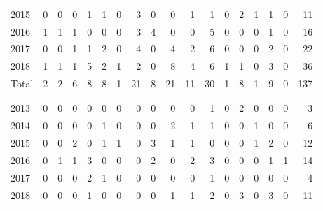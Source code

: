 \documentclass[a4paper]{article}
\begin{document}
\begin{table}
{\begin{tabular}[t]{lrrrrrrrrrrrrrrrrr}
\hspace{1em}\hspace{1em}2015 & 0 & 0 & 0 & 1 & 1 & 0 & 3 & 0 & 0 & 1 & 1 & 0 & 2 & 1 & 1 & 0 & 11\\
\hspace{1em}\hspace{1em}2016 & 1 & 1 & 1 & 0 & 0 & 0 & 3 & 4 & 0 & 0 & 5 & 0 & 0 & 0 & 1 & 0 & 16\\
\hspace{1em}\hspace{1em}2017 & 0 & 0 & 1 & 1 & 2 & 0 & 4 & 0 & 4 & 2 & 6 & 0 & 0 & 0 & 2 & 0 & 22\\
\hspace{1em}\hspace{1em}2018 & 1 & 1 & 1 & 5 & 2 & 1 & 2 & 0 & 8 & 4 & 6 & 1 & 1 & 0 & 3 & 0 & 36\\
\hspace{1em}\hspace{1em}Total & 2 & 2 & 6 & 8 & 8 & 1 & 21 & 8 & 21 & 11 & 30 & 1 & 8 & 1 & 9 & 0 & 137\\
\addlinespace[0.3em]
\multicolumn{18}{l}{\textbf{Withdrawal}}\\
\addlinespace[0.3em]
\multicolumn{18}{l}{\textbf{Female}}\\
\hspace{1em}\hspace{1em}2013 & 0 & 0 & 0 & 0 & 0 & 0 & 0 & 0 & 0 & 0 & 1 & 0 & 2 & 0 & 0 & 0 & 3\\
\hspace{1em}\hspace{1em}2014 & 0 & 0 & 0 & 0 & 1 & 0 & 0 & 0 & 2 & 1 & 1 & 0 & 0 & 1 & 0 & 0 & 6\\
\hspace{1em}\hspace{1em}2015 & 0 & 0 & 2 & 0 & 1 & 1 & 0 & 3 & 1 & 1 & 0 & 0 & 0 & 1 & 2 & 0 & 12\\
\hspace{1em}\hspace{1em}2016 & 0 & 1 & 1 & 3 & 0 & 0 & 0 & 2 & 0 & 2 & 3 & 0 & 0 & 0 & 1 & 1 & 14\\
\hspace{1em}\hspace{1em}2017 & 0 & 0 & 0 & 2 & 1 & 0 & 0 & 0 & 0 & 0 & 1 & 0 & 0 & 0 & 0 & 0 & 4\\
\hspace{1em}\hspace{1em}2018 & 0 & 0 & 0 & 1 & 0 & 0 & 0 & 0 & 1 & 1 & 2 & 0 & 3 & 0 & 3 & 0 & 11\\

\end{tabular}}
\end{table}
\end{document}
